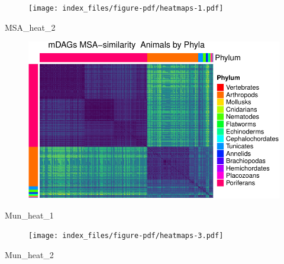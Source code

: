 \documentclass[
  letterpaper,
  DIV=11,
  numbers=noendperiod]{scrreprt}
\newenvironment{Shaded}{}{}
\newcommand{\NormalTok}[1]{\textcolor[rgb]{0.67,0.70,0.75}{#1}}
\begin{document}
\begin{figure}[H]

{\centering \texttt{[image: index\_files/figure-pdf/heatmaps-1.pdf]}

}

\end{figure}

\begin{Shaded}
\begin{Highlighting}[]
\NormalTok{MSA\_heat\_2}
\end{Highlighting}
\end{Shaded}

\begin{figure}[H]

{\centering \includegraphics[width=1\textwidth,height=\textheight]{index_files/figure-pdf/heatmaps-2.pdf}

}

\end{figure}

\begin{Shaded}
\begin{Highlighting}[]
\NormalTok{Mun\_heat\_1}
\end{Highlighting}
\end{Shaded}

\begin{figure}[H]

{\centering \texttt{[image: index\_files/figure-pdf/heatmaps-3.pdf]}

}

\end{figure}

\begin{Shaded}
\begin{Highlighting}[]
\NormalTok{Mun\_heat\_2}
\end{Highlighting}
\end{Shaded}
\end{document}
